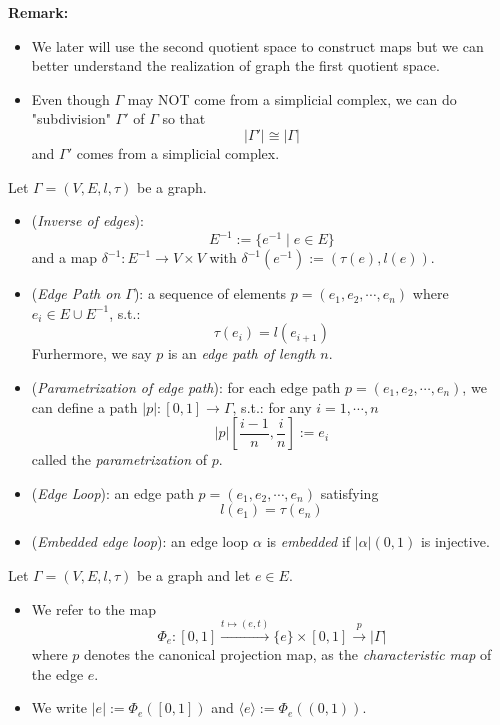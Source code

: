\noindent\textbf{Remark:} \begin{itemize}
    \item We later will use the second quotient space to construct maps but we can better understand the realization of graph the first quotient space.

    \item Even though $\Gamma$ may NOT come from a simplicial complex, we can do "subdivision" $\Gamma'$ of $\Gamma$ so that
    $$|\Gamma'| \cong |\Gamma|$$
    and $\Gamma'$ comes from a simplicial complex.
\end{itemize}


\begin{definition}
    Let $\Gamma = (V,E,l,\tau)$ be a graph.
    \begin{itemize}
        \item (\textit{Inverse of edges}): 
        $$E^{-1} := \{ e^{-1} \mid e \in E \}$$
        and a map $\delta^{-1}: E^{-1} \rightarrow V \times V$ with $\delta^{-1} (e^{-1}) := (\tau(e), l(e))$.
        \item (\textit{Edge Path on $\Gamma$}): a sequence of elements $p= (e_1, e_2 ,\cdots, e_n)$ where $e_i \in E \cup E^{-1}$, s.t.:
        $$\tau(e_i) = l(e_{i+1})$$
        Furhermore, we say $p$ is an \textit{edge path of length $n$}.
        \item (\textit{Parametrization of edge path}): for each edge path $p = (e_1, e_2 ,\cdots, e_n)$, we can define a path $|p| : [0,1] \rightarrow \Gamma$, s.t.: for any $i= 1,\cdots, n$
        $$|p| [\frac{i-1}{n}, \frac{i}{n}] := e_i$$
        called the \textit{parametrization} of $p$.
        \item (\textit{Edge Loop}): an edge path $p = (e_1, e_2 ,\cdots, e_n)$ satisfying
        $$l(e_1) = \tau(e_n)$$
        \item (\textit{Embedded edge loop}): an edge loop $\alpha$ is \textit{embedded} if $|\alpha| (0,1)$ is injective.
    \end{itemize}
\end{definition}

\begin{definition}
    Let $\Gamma= (V,E,l,\tau)$ be a graph and let $e \in E$.
    \begin{itemize}
        \item We refer to the map $$\Phi_e: [0,1] \overset{t \mapsto (e,t)}{\longrightarrow} \{e\} \times [0,1] \overset{p}{\to} |\Gamma|$$
        where $p$ denotes the canonical projection map, as the \textit{characteristic map} of the edge $e$.
        \item We write $|e|:= \Phi_e([0,1])$ and $\langle e\rangle := \Phi_e ((0,1))$.
    \end{itemize}
\end{definition}

